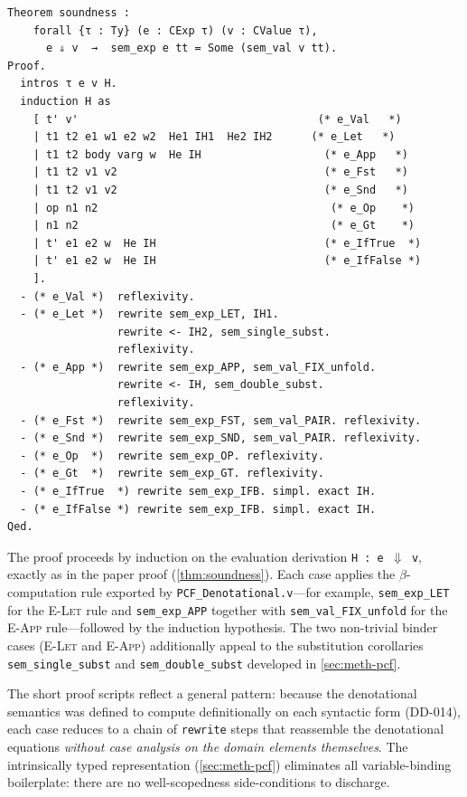 \begin{lstlisting}[caption={Soundness theorem and proof (\texttt{PCF\_Soundness.v}).},
                    label={lst:soundness}]
Theorem soundness :
    forall {τ : Ty} (e : CExp τ) (v : CValue τ),
      e ⇓ v  →  sem_exp e tt = Some (sem_val v tt).
Proof.
  intros τ e v H.
  induction H as
    [ t' v'                                     (* e_Val   *)
    | t1 t2 e1 w1 e2 w2  He1 IH1  He2 IH2      (* e_Let   *)
    | t1 t2 body varg w  He IH                   (* e_App   *)
    | t1 t2 v1 v2                                (* e_Fst   *)
    | t1 t2 v1 v2                                (* e_Snd   *)
    | op n1 n2                                    (* e_Op    *)
    | n1 n2                                       (* e_Gt    *)
    | t' e1 e2 w  He IH                          (* e_IfTrue  *)
    | t' e1 e2 w  He IH                          (* e_IfFalse *)
    ].
  - (* e_Val *)  reflexivity.
  - (* e_Let *)  rewrite sem_exp_LET, IH1.
                 rewrite <- IH2, sem_single_subst.
                 reflexivity.
  - (* e_App *)  rewrite sem_exp_APP, sem_val_FIX_unfold.
                 rewrite <- IH, sem_double_subst.
                 reflexivity.
  - (* e_Fst *)  rewrite sem_exp_FST, sem_val_PAIR. reflexivity.
  - (* e_Snd *)  rewrite sem_exp_SND, sem_val_PAIR. reflexivity.
  - (* e_Op  *)  rewrite sem_exp_OP. reflexivity.
  - (* e_Gt  *)  rewrite sem_exp_GT. reflexivity.
  - (* e_IfTrue  *) rewrite sem_exp_IFB. simpl. exact IH.
  - (* e_IfFalse *) rewrite sem_exp_IFB. simpl. exact IH.
Qed.
\end{lstlisting}

The proof proceeds by induction on the evaluation derivation
\texttt{H~:~e~$\Downarrow$~v}, exactly as in the paper proof
(\cref{thm:soundness}).  Each case applies the $\beta$-computation
rule exported by \texttt{PCF\_Denotational.v}---for example,
\texttt{sem\_exp\_LET} for the \textsc{E-Let} rule and
\texttt{sem\_exp\_APP} together with \texttt{sem\_val\_FIX\_unfold}
for the \textsc{E-App} rule---followed by the induction hypothesis.
The two non-trivial binder cases (\textsc{E-Let} and \textsc{E-App})
additionally appeal to the substitution corollaries
\texttt{sem\_single\_subst} and \texttt{sem\_double\_subst}
developed in \cref{sec:meth-pcf}.

The short proof scripts reflect a general pattern: because the
denotational semantics was defined to compute definitionally on each
syntactic form (DD-014), each case reduces to a chain of
\texttt{rewrite} steps that reassemble the denotational equations
\emph{without case analysis on the domain elements themselves}.
The intrinsically typed representation
(\cref{sec:meth-pcf}) eliminates all variable-binding boilerplate:
there are no well-scopedness side-conditions to discharge.

